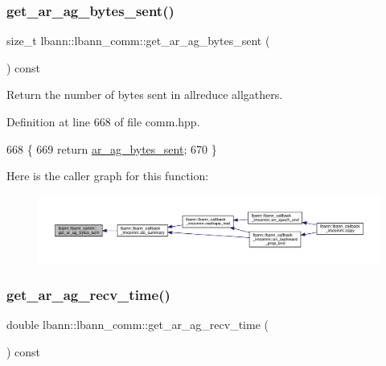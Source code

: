\subsubsection{\texorpdfstring{get\+\_\+ar\+\_\+ag\+\_\+bytes\+\_\+sent()}{get\_ar\_ag\_bytes\_sent()}}
{\footnotesize\ttfamily size\+\_\+t lbann\+::lbann\+\_\+comm\+::get\+\_\+ar\+\_\+ag\+\_\+bytes\+\_\+sent (\begin{DoxyParamCaption}{ }\end{DoxyParamCaption}) const\hspace{0.3cm}{\ttfamily [inline]}}

Return the number of bytes sent in allreduce allgathers. 

Definition at line 668 of file comm.\+hpp.


\begin{DoxyCode}
668                                              \{
669     \textcolor{keywordflow}{return} \hyperlink{classlbann_1_1lbann__comm_a2cfe1264a83865360692c48d7869fe67}{ar\_ag\_bytes\_sent};
670   \}
\end{DoxyCode}
Here is the caller graph for this function\+:\nopagebreak
\begin{figure}[H]
\begin{center}
\leavevmode
\includegraphics[width=350pt]{classlbann_1_1lbann__comm_af745b91711014bf5a9f8d2466b5a6634_icgraph}
\end{center}
\end{figure}
\mbox{\label{classlbann_1_1lbann__comm_a78820c4fbd15df596d41844276cc966a}} 
\subsubsection{\texorpdfstring{get\+\_\+ar\+\_\+ag\+\_\+recv\+\_\+time()}{get\_ar\_ag\_recv\_time()}}
{\footnotesize\ttfamily double lbann\+::lbann\+\_\+comm\+::get\+\_\+ar\+\_\+ag\+\_\+recv\+\_\+time (\begin{DoxyParamCaption}{ }\end{DoxyParamCaption}) const\hspace{0.3cm}{\ttfamily [inline]}}

